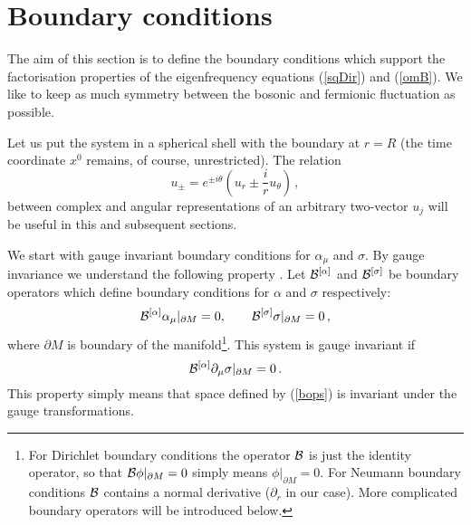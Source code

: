 \documentclass[a4paper,12pt]{article}
\begin{document}
\section{Boundary conditions}\label{bcsec}
The aim of this section is to define the boundary conditions which
support the factorisation properties of the eigenfrequency equations
(\ref{sqDir}) and (\ref{omB}). We like to keep as much symmetry between
the bosonic and fermionic fluctuation as possible. 

Let us put the system in a spherical 
shell with the boundary at $r=R$ (the time coordinate $x^0$ remains,
of course, unrestricted). The relation
\begin{equation}
u_\pm = e^{\pm i\theta} \left( u_r \pm \frac ir u_\theta \right)\,,
\label{pmrt}
\end{equation}
between complex and angular representations of an arbitrary two-vector $u_j$
will be useful in this and subsequent sections.

We start with gauge invariant boundary conditions for $\alpha_\mu$
and $\sigma$. By gauge invariance we understand the following property
\cite{Vassilevich:1997iz}. Let ${\cal B}^{[\alpha]}$ and 
${\cal B}^{[\sigma]}$ be boundary operators which define boundary conditions
for $\alpha$ and $\sigma$ respectively:
\begin{equation}
{\cal B}^{[\alpha]} \alpha_\mu |_{\partial M}=0,\qquad
{\cal B}^{[\sigma]} \sigma |_{\partial M}=0 \,,\label{bops}
\end{equation}
where $\partial M$ is boundary of the manifold\footnote{For Dirichlet
boundary conditions the operator ${\cal B}$ is just the identity operator,
so that ${\cal B}\phi |_{\partial M}=0$ simply means 
$\phi |_{\partial M}=0$. For Neumann boundary conditions ${\cal B}$
contains a normal derivative ($\partial_r$ in our case). More complicated
boundary operators will be introduced below.}. 
This system is gauge invariant if 
\begin{equation}
{\cal B}^{[\alpha]} \partial_\mu \sigma |_{\partial M}=0 \,.
\label{gauinv}
\end{equation}
This property simply means that space defined by (\ref{bops}) is invariant
under the gauge transformations.
\end{document}
